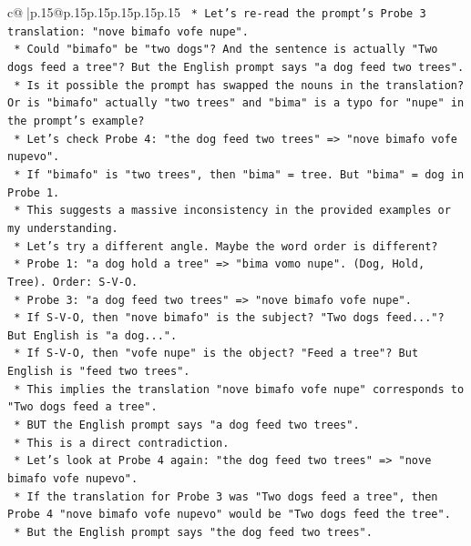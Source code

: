 \documentclass{article}
\begin{document}
{\begin{supertabular}{c@{$\;$}|p{.15\linewidth}@{}p{.15\linewidth}p{.15\linewidth}p{.15\linewidth}p{.15\linewidth}p{.15\linewidth}}
{{{\texttt{                *   Let's re{-}read the prompt's Probe 3 translation: "nove bimafo vofe nupe".} \\
\texttt{                *   Could "bimafo" be "two dogs"? And the sentence is actually "Two dogs feed a tree"? But the English prompt says "a dog feed two trees".} \\
\texttt{                *   Is it possible the prompt has swapped the nouns in the translation? Or is "bimafo" actually "two trees" and "bima" is a typo for "nupe" in the prompt's example?} \\
\texttt{                *   Let's check Probe 4: "the dog feed two trees" => "nove bimafo vofe nupevo".} \\
\texttt{                *   If "bimafo" is "two trees", then "bima" = tree. But "bima" = dog in Probe 1.} \\
\texttt{                *   This suggests a massive inconsistency in the provided examples or my understanding.} \\
\texttt{                *   Let's try a different angle. Maybe the word order is different?} \\
\texttt{                *   Probe 1: "a dog hold a tree" => "bima vomo nupe". (Dog, Hold, Tree). Order: S{-}V{-}O.} \\
\texttt{                *   Probe 3: "a dog feed two trees" => "nove bimafo vofe nupe".} \\
\texttt{                    *   If S{-}V{-}O, then "nove bimafo" is the subject? "Two dogs feed..."? But English is "a dog...".} \\
\texttt{                    *   If S{-}V{-}O, then "vofe nupe" is the object? "Feed a tree"? But English is "feed two trees".} \\
\texttt{                    *   This implies the translation "nove bimafo vofe nupe" corresponds to "Two dogs feed a tree".} \\
\texttt{                    *   BUT the English prompt says "a dog feed two trees".} \\
\texttt{                    *   This is a direct contradiction.} \\
\texttt{                *   Let's look at Probe 4 again: "the dog feed two trees" => "nove bimafo vofe nupevo".} \\
\texttt{                    *   If the translation for Probe 3 was "Two dogs feed a tree", then Probe 4 "nove bimafo vofe nupevo" would be "Two dogs feed the tree".} \\
\texttt{                    *   But the English prompt says "the dog feed two trees".} \\
}}}
\end{supertabular}}
\end{document}
